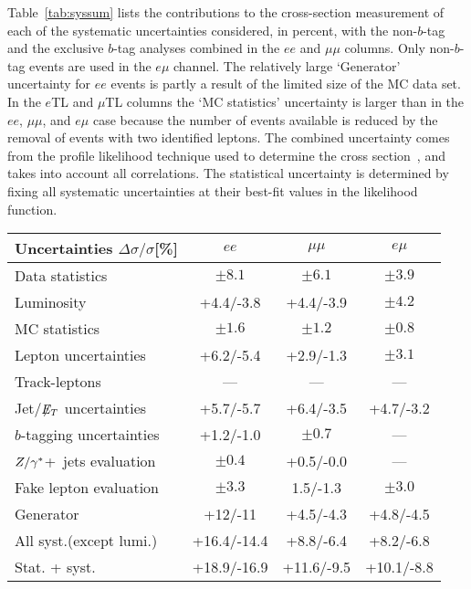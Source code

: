 Table~\ref{tab:syssum} lists the contributions to the cross-section
measurement of each of the systematic uncertainties considered, in
percent, with the non-$b$-tag and the exclusive $b$-tag analyses
combined in the $ee$ and $\mu\mu$ columns.  Only non-$b$-tag events
are used in the $e\mu$ channel.  The relatively large `Generator'
uncertainty for $ee$ events is partly a result of the limited size
of the MC data set.  In the $e$TL and $\mu$TL columns the `MC
statistics' uncertainty is larger than in the $ee$, $\mu\mu$, and
$e\mu$ case because the number of events available is reduced by the
removal of events with two identified leptons.  The combined
uncertainty comes from the profile likelihood technique used to
determine the cross section~\cite{ATL-CONF-2011-034}, and takes into
account all correlations.  The statistical uncertainty is determined
by fixing all systematic uncertainties at their best-fit values in
the likelihood function.

%


\begin{table*}[htb]
\begin{footnotesize}
\centering
\begin{tabular}{|l|c|c|c|}
\hline
           Uncertainties  $\Delta\sigma/\sigma$[\%]        & $ee$              & $\mu\mu$          & $e\mu$ \\ \hline

Data statistics           &    $\pm 8.1$  &    $\pm 6.1$  &    $\pm 3.9$  \\
\hline
Luminosity                &    +4.4/-3.8 &    +4.4/-3.9   &    $\pm 4.2$  \\
\hline
MC statistics             &    $\pm 1.6$  &    $\pm 1.2$  &    $\pm 0.8$  \\
Lepton uncertainties      &    +6.2/-5.4  &    +2.9/-1.3  &    $\pm 3.1$  \\
Track-leptons             &     ---       &    ---        & ---           \\
Jet/$\not\!\!{E_{T}}$ uncertainties  &    +5.7/-5.7  &    +6.4/-3.5  & +4.7/-3.2     \\
$b$-tagging uncertainties &    +1.2/-1.0  &    $\pm 0.7$  &     ---       \\
$Z/\gamma^{*}$+~jets evaluation    &    $\pm 0.4$  &    +0.5/-0.0  &     ---       \\
Fake lepton evaluation    &    $\pm 3.3$  &    1.5/-1.3   &    $\pm 3.0$  \\
Generator                 &   +12/-11     &    +4.5/-4.3  &   +4.8/-4.5   \\
\hline
All syst.(except lumi.)   &   +16.4/-14.4 &    +8.8/-6.4  &    +8.2/-6.8  \\
\hline \hline
Stat. + syst.             &   +18.9/-16.9 &    +11.6/-9.5 &    +10.1/-8.8 \\
\hline

\end{tabular}
\caption{Overview of the \ttbar{} cross-section uncertainties.}
\label{tab:syssum}
\end{footnotesize}
\end{table*}


